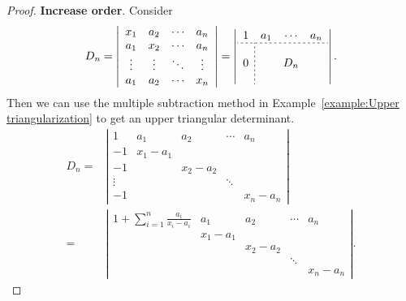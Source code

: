\documentclass{report}
\theoremstyle{nonumberplain}
\newtheorem{proof}{Proof.}
\begin{document}
\begin{proof}
	\textbf{Increase order}. Consider
	\begin{equation*}		
		\begin{aligned}
		D_{n}=\left|\begin{array}{cccc}
			x_{1} & a_{2} & \cdots & a_{n} \\
			a_{1} & x_{2} & \cdots & a_{n} \\
			\vdots & \vdots & \ddots & \vdots \\
			a_{1} & a_{2} & \cdots & x_{n}
		\end{array}\right|=
		\left|\begin{array}{c;{2pt/2pt}ccc}
			1 & a_{1} & \cdots & a_{n} \\\hdashline[2pt/2pt]
			 &   &   &   \\
			0 &   & D_n &   \\
			\phantom{a} &   &   &  
		\end{array}\right|.
		\end{aligned}
	\end{equation*}
Then we can use the multiple subtraction method in Example~\ref{example:Upper triangularization} to get an upper triangular determinant.
	\begin{equation*}		
		\begin{aligned}
			D_{n}=&\left|\begin{array}{ccccc}
				1 & a_{1} & a_2 & \cdots & a_{n} \\
				-1&x_1-a_{1}&  &  &  \\
				-1& & x_2-a_2 &  &  \\
				\vdots & &  & \ddots &  \\
				-1&  &  &  & x_n-a_n
			\end{array}\right|\\
			=&\left|\begin{array}{ccccc}
				1+\sum_{i=1}^{n} \frac{a_{i}}{x_{i}-a_{i}} & a_{1} & a_2 & \cdots & a_{n} \\
				 &x_1-a_{1}&  &  &  \\
				 & & x_2-a_2 &  &  \\
				  & &  & \ddots &  \\
				 &  &  &  & x_n-a_n
			\end{array}\right|.
		\end{aligned}
	\end{equation*}
\end{proof}
\end{document}
